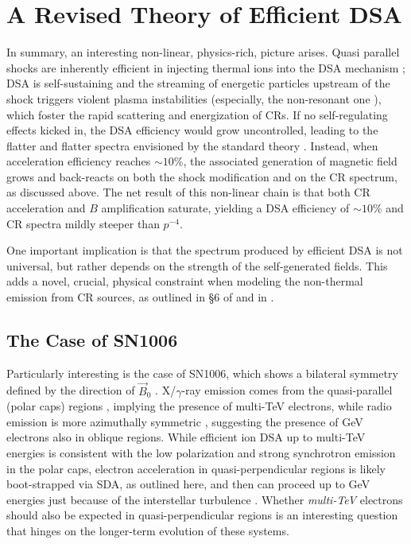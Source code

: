 \documentclass[varenna]{cimento}
\begin{document}
\section{A Revised Theory of Efficient DSA}\label{sec:revised}
In summary, an interesting non-linear, physics-rich, picture arises. 
Quasi parallel shocks are inherently efficient in injecting thermal ions into the DSA mechanism \cite{caprioli+14a, caprioli+15};
DSA is self-sustaining and the streaming of energetic particles upstream of the shock triggers violent plasma instabilities (especially, the non-resonant one \cite{bell04}), which foster the rapid scattering and energization of CRs.
If no self-regulating effects kicked in, the DSA efficiency would grow uncontrolled, leading to the flatter and flatter spectra envisioned by the standard theory \cite{jones+91, malkov+01}.
Instead, when acceleration efficiency reaches $\sim 10\%$, the associated generation of magnetic field grows and back-reacts on both the shock modification and on the CR spectrum, as discussed above.
The net result of this non-linear chain is that both CR acceleration and $B$ amplification saturate, yielding a DSA efficiency of $\sim 10\%$ and CR spectra mildly steeper than $p^{-4}$.

One important implication is that the spectrum produced by efficient DSA is not universal, but rather depends on the strength of the self-generated  fields.
This adds a novel, crucial, physical constraint when modeling the non-thermal emission from CR sources, as outlined in \S6 of \cite{caprioli+20} and in \cite{diesing+21}.


\subsection{The Case of SN1006}
Particularly interesting is the case of SN1006, which shows a bilateral symmetry defined by the direction of $\vec{B}_0$ \cite{rothenflug+04,bocchino+11}.
X/$\gamma$-ray emission comes from the quasi-parallel (polar caps) regions \cite{gamil+08,giuffrida+22,SN1006HESS}, implying the presence of multi-TeV electrons, while radio emission is more azimuthally symmetric \cite{rothenflug+04}, suggesting the presence of GeV electrons also in oblique regions.
While efficient ion DSA up to multi-TeV energies is consistent with the low polarization and strong synchrotron emission in the polar caps, electron acceleration in quasi-perpendicular regions is likely boot-strapped via SDA, as outlined here, and then can proceed up to GeV energies just because of the interstellar turbulence \cite{caprioli15p,blasi13}.
Whether \emph{multi-TeV} electrons should also be expected in quasi-perpendicular regions is an interesting question that hinges on the longer-term evolution of these systems. 
\end{document}
